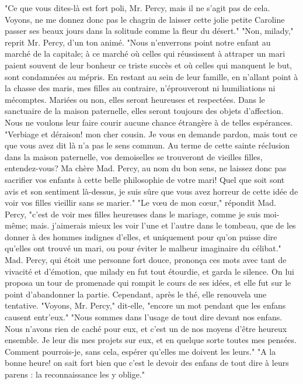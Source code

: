 "Ce que vous dites-là est fort poli, Mr. Percy, mais il ne s'agit pas de cela. Voyons, ne me donnez donc pas le chagrin de laisser cette jolie petite Caroline passer ses beaux jours dans la solitude comme la fleur du désert."
"Non, milady," reprit Mr. Percy, d'un ton animé. "Nous n'enverrons point notre enfant au marché de la capitale; à ce marché\setcounter{page}{393} où celles qui réussissent à attraper un mari paient souvent de leur bonheur ce triste succès et où celles qui manquent le but, sont condamnées au mépris. En restant au sein de leur famille, en n'allant point à la chasse des maris, mes filles au contraire, n'éprouveront ni humiliations ni mécomptes. Mariées ou non, elles seront heureuses et respectées. Dans le sanctuaire de la maison paternelle, elles seront toujours des objets d'affection. Nous ne voulons leur faire courir aucune chance étrangère à de telles espérances.
"Verbiage et déraison! mon cher cousin. Je vous en demande pardon, mais tout ce que vous avez dit là n'a pas le sens commun. Au terme de cette sainte réclusion dans la maison paternelle, vos demoiselles se trouveront de vieilles filles, entendez-vous? Ma chère Mad. Percy, au nom du bon sens, ne laissez donc pas sacrifier vos enfants à cette belle philosophie de votre mari! Quel que soit sont avis et son sentiment là-dessus, je suis sûre que vous avez horreur de cette idée de voir vos filles vieillir sans se marier."
"Le vœu de mon cœur," répondit Mad. Percy, "c'est de voir mes filles heureuses dans le mariage, comme je suis moi-même; mais.\setcounter{page}{394} j'aimerais mieux les voir l'une et l'autre dans le tombeau, que de les donner à des hommes indignes d'elles, et uniquement pour qu'on puisse dire qu'elles ont trouvé un mari, ou pour éviter le malheur imaginaire du célibat."
Mad. Percy, qui étoit une personne fort douce, prononça ces mots avec tant de vivacité et d'émotion, que milady en fut tout étourdie, et garda le silence. On lui proposa un tour de promenade qui rompit le cours de ses idées, et elle fut sur le point d'abandonner la partie. Cependant, après le thé, elle renouvela une tentative.
"Voyons, Mr. Percy," dit-elle, "encore un mot pendant que les enfans causent entr'eux."
"Nous sommes dans l'usage de tout dire devant nos enfans. Nous n'avons rien de caché pour eux, et c'est un de nos moyens d'être heureux ensemble. Je leur dis mes projets sur eux, et en quelque sorte toutes mes pensées. Comment pourrois-je, sans cela, espérer qu'elles me doivent les leurs."
"A la bonne heure! on sait fort bien que c'est le devoir des enfans de tout dire à leurs parens : la reconnaissance les y oblige."
